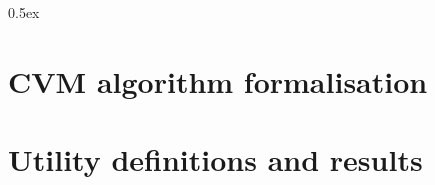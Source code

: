 \documentclass[11pt, a4paper]{report}
\begin{document}
\parindent 0pt
\parskip 0.5ex

\chapter{CVM algorithm formalisation}










\chapter{Utility definitions and results}














\end{document}
